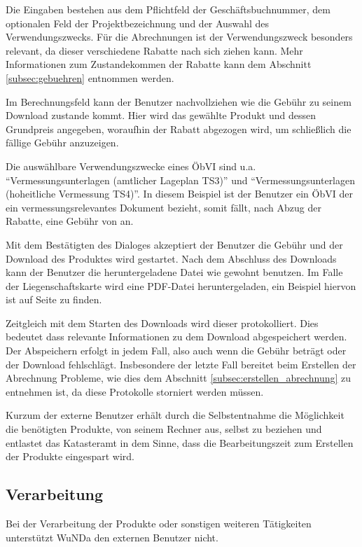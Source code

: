Die Eingaben bestehen aus dem Pflichtfeld der Geschäftsbuchnummer, dem optionalen Feld der Projektbezeichnung und der Auswahl des Verwendungszwecks.
Für die Abrechnungen ist der Verwendungszweck besonders relevant, da dieser verschiedene Rabatte nach sich ziehen kann. Mehr Informationen zum Zustandekommen der Rabatte kann dem Abschnitt \ref{subsec:gebuehren} entnommen werden.

Im Berechnungsfeld kann der Benutzer nachvollziehen wie die Gebühr zu seinem Download zustande kommt. Hier wird das gewählte Produkt und dessen Grundpreis angegeben, woraufhin der Rabatt abgezogen wird, um schließlich die fällige Gebühr anzuzeigen.

Die auswählbare Verwendungszwecke eines \ac{ÖbVI} sind u.a. "`Vermessungsunterlagen (amtlicher Lageplan TS3)"' und "`Vermessungsunterlagen (hoheitliche Vermessung TS4)"'. In diesem Beispiel ist der Benutzer ein \ac{ÖbVI} der ein vermessungsrelevantes Dokument bezieht, somit fällt, nach Abzug der Rabatte, eine Gebühr von  an.

Mit dem Bestätigten des Dialoges akzeptiert der Benutzer die Gebühr und der Download des Produktes wird gestartet. Nach dem Abschluss des Downloads kann der Benutzer die heruntergeladene Datei wie gewohnt benutzen. Im Falle der Liegenschaftskarte wird eine PDF-Datei heruntergeladen, ein Beispiel hiervon ist auf Seite \pageref{fig:flurkarte} zu finden.

Zeitgleich mit dem Starten des Downloads wird dieser protokolliert. Dies bedeutet dass relevante Informationen zu dem Download abgespeichert werden. Der Abspeichern erfolgt in jedem Fall, also auch wenn die Gebühr  beträgt oder der Download fehlschlägt. Insbesondere der letzte Fall bereitet beim Erstellen der Abrechnung Probleme, wie dies dem Abschnitt \vref{subsec:erstellen_abrechnung} zu entnehmen ist, da diese Protokolle storniert werden müssen.
 
Kurzum der externe Benutzer erhält durch die Selbstentnahme die Möglichkeit die benötigten Produkte, von seinem Rechner aus, selbst zu beziehen und entlastet das Katasteramt in dem Sinne, dass die Bearbeitungszeit zum Erstellen der Produkte eingespart wird.

\subsection{Verarbeitung}
Bei der Verarbeitung der Produkte oder sonstigen weiteren Tätigkeiten unterstützt \ac{WuNDa} den externen Benutzer nicht.

